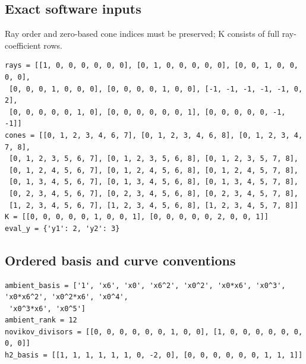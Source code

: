 \documentclass[10pt,a4paper]{article}
\begin{document}
\subsection*{Exact software inputs}
Ray order and zero-based cone indices must be preserved; K consists of full ray-coefficient rows.
\begin{lstlisting}
rays = [[1, 0, 0, 0, 0, 0, 0], [0, 1, 0, 0, 0, 0, 0], [0, 0, 1, 0, 0, 0, 0],
 [0, 0, 0, 1, 0, 0, 0], [0, 0, 0, 0, 1, 0, 0], [-1, -1, -1, -1, -1, 0, 2],
 [0, 0, 0, 0, 0, 1, 0], [0, 0, 0, 0, 0, 0, 1], [0, 0, 0, 0, 0, -1, -1]]
cones = [[0, 1, 2, 3, 4, 6, 7], [0, 1, 2, 3, 4, 6, 8], [0, 1, 2, 3, 4, 7, 8],
 [0, 1, 2, 3, 5, 6, 7], [0, 1, 2, 3, 5, 6, 8], [0, 1, 2, 3, 5, 7, 8],
 [0, 1, 2, 4, 5, 6, 7], [0, 1, 2, 4, 5, 6, 8], [0, 1, 2, 4, 5, 7, 8],
 [0, 1, 3, 4, 5, 6, 7], [0, 1, 3, 4, 5, 6, 8], [0, 1, 3, 4, 5, 7, 8],
 [0, 2, 3, 4, 5, 6, 7], [0, 2, 3, 4, 5, 6, 8], [0, 2, 3, 4, 5, 7, 8],
 [1, 2, 3, 4, 5, 6, 7], [1, 2, 3, 4, 5, 6, 8], [1, 2, 3, 4, 5, 7, 8]]
K = [[0, 0, 0, 0, 0, 1, 0, 0, 1], [0, 0, 0, 0, 0, 2, 0, 0, 1]]
eval_y = {'y1': 2, 'y2': 3}
\end{lstlisting}
\subsection*{Ordered basis and curve conventions}
\begin{lstlisting}
ambient_basis = ['1', 'x6', 'x0', 'x6^2', 'x0^2', 'x0*x6', 'x0^3', 'x0*x6^2', 'x0^2*x6', 'x0^4',
 'x0^3*x6', 'x0^5']
ambient_rank = 12
novikov_divisors = [[0, 0, 0, 0, 0, 0, 1, 0, 0], [1, 0, 0, 0, 0, 0, 0, 0, 0]]
h2_basis = [[1, 1, 1, 1, 1, 1, 0, -2, 0], [0, 0, 0, 0, 0, 0, 1, 1, 1]]
\end{lstlisting}
\end{document}
